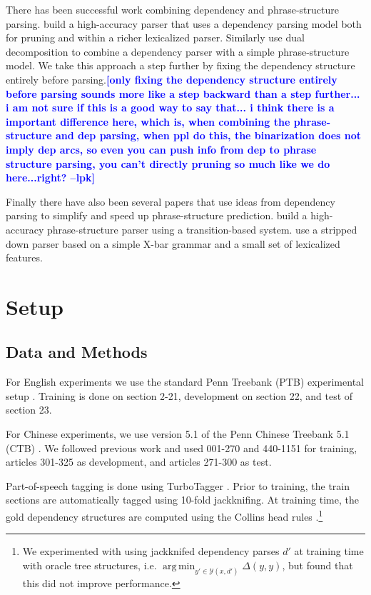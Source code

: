 \documentclass[11pt,letterpaper]{article}
\DeclareMathOperator*{\argmin}{arg\,min}
\newcommand{\lpkcomment}[1]{\textcolor{blue}{\bf \small [#1 --lpk]}}
\begin{document}
There has been successful work combining dependency and phrase-structure parsing.  build a
high-accuracy parser that uses a dependency parsing model both for
pruning and within a richer lexicalized parser. Similarly
 use dual decomposition to combine a dependency
parser with a simple phrase-structure model. We take this
approach a step further by fixing the dependency structure
entirely before parsing.\lpkcomment{only fixing the dependency structure
entirely before parsing sounds more like a step backward than a step further... i am not sure if this is a good way to say that... i think there is a important difference here, which is, when combining the phrase-structure and dep parsing, when ppl do this, the binarization does not imply dep arcs, so even you can push info from dep to phrase structure parsing, you can't directly pruning so much like we do here...right?}


Finally there have also been several papers that use ideas from
dependency parsing to simplify and speed up phrase-structure prediction.
 build a high-accuracy phrase-structure parser
using a transition-based system.  use a stripped
down parser based on a simple X-bar grammar and a small set of lexicalized features.

\section{Setup}


\subsection{Data and Methods}

For English experiments we use the standard Penn Treebank (PTB)
experimental setup \cite{marcus1993building}. Training is done on
section 2-21, development on section 22, and test of section 23.

For Chinese experiments, we use version 5.1 of the Penn  Chinese Treebank 5.1 (CTB) \cite{xue2005penn}. We followed previous work and used
001-270 and 440-1151 for training, articles
301-325 as development, and articles
271-300 as test.

Part-of-speech tagging is done using TurboTagger
\cite{martins2013turning}. Prior to training, the train sections are
automatically tagged using 10-fold jackknifing. At training time, the
gold dependency structures are computed using the Collins head rules
\cite{collins2003head}.\footnote{ We experimented with using
  jackknifed dependency parses $d'$ at training time with oracle tree
  structures, i.e. $\argmin_{y' \in \mathcal{Y}(x, d')} \Delta(y, y)$,
  but found that this did not improve performance.}
\end{document}
